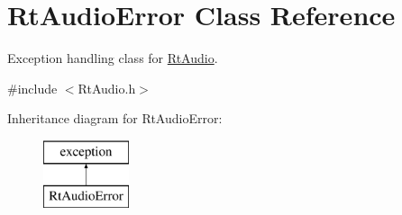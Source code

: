 \hypertarget{class_rt_audio_error}{}\section{Rt\+Audio\+Error Class Reference}
\label{class_rt_audio_error}


Exception handling class for \hyperlink{class_rt_audio}{Rt\+Audio}.  




{\ttfamily \#include $<$Rt\+Audio.\+h$>$}

Inheritance diagram for Rt\+Audio\+Error\+:\begin{figure}[H]
\begin{center}
\leavevmode
\includegraphics[height=2.000000cm]{class_rt_audio_error}
\end{center}
\end{figure}

